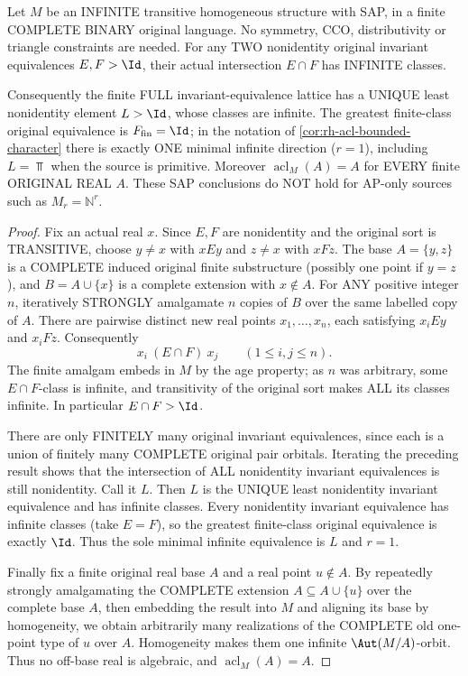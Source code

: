 \begin{lemma}
\label{lem:rh-sap-invariant-monolith}
Let $M$ be an INFINITE transitive homogeneous structure
with SAP, in a finite COMPLETE BINARY original language.
No symmetry, CCO, distributivity or triangle constraints
are needed. For any TWO nonidentity original invariant
equivalences $E,F>\Id$, their actual intersection
$E\cap F$ has INFINITE classes.

Consequently the finite FULL invariant-equivalence lattice
has a UNIQUE least nonidentity element $L>\Id$, whose
classes are infinite. The greatest finite-class original
equivalence is $F_{\mathrm{fin}}=\Id$; in the notation of
\cref{cor:rh-acl-bounded-character} there is exactly
ONE minimal infinite direction ($r=1$), including
$L=\Top$ when the source is primitive.
Moreover $\operatorname{acl}_M(A)=A$ for EVERY finite
ORIGINAL REAL $A$. These SAP conclusions do NOT
hold for AP-only sources such as $M_r=\mathbb N^r$.
\end{lemma}
\begin{proof}
Fix an actual real $x$. Since $E,F$ are nonidentity
and the original sort is TRANSITIVE,
choose $y\ne x$ with $xEy$ and
$z\ne x$ with $xFz$.
The base $A=\{y,z\}$ is a COMPLETE induced original
finite substructure (possibly one point if $y=z$),
and $B=A\cup\{x\}$ is a complete extension with
$x\notin A$.  For ANY positive integer $n$,
iteratively STRONGLY amalgamate $n$ copies of $B$
over the same labelled copy of $A$.
There are pairwise distinct new real points
$x_1,\ldots,x_n$, each satisfying
$x_iEy$ and $x_iFz$. Consequently
\[
                 x_i\ (E\cap F)\ x_j
                  \qquad(1\le i,j\le n).
\]
The finite amalgam embeds in $M$ by the age
property; as $n$ was arbitrary, some
$E\cap F$-class is infinite, and transitivity
of the original sort makes ALL its classes
infinite. In particular $E\cap F>\Id$.

There are only FINITELY many original invariant
equivalences, since each is a union of
finitely many COMPLETE original pair orbitals.
Iterating the preceding result shows that the
intersection of ALL nonidentity invariant
equivalences is still nonidentity.
Call it $L$. Then $L$ is the UNIQUE least
nonidentity invariant equivalence and has
infinite classes. Every nonidentity invariant
equivalence has infinite classes (take $E=F$),
so the greatest finite-class original equivalence
is exactly $\Id$. Thus the sole minimal infinite
equivalence is $L$ and $r=1$.

Finally fix a finite original real base $A$
and a real point $u\notin A$.
By repeatedly strongly amalgamating
the COMPLETE extension $A\subseteq A\cup\{u\}$
over the complete base $A$, then embedding
the result into $M$ and aligning its base by
homogeneity, we obtain arbitrarily many
realizations of the COMPLETE old one-point
type of $u$ over $A$. Homogeneity makes them
one infinite $\Aut(M/A)$-orbit.
Thus no off-base real is algebraic, and
$\operatorname{acl}_M(A)=A$.
\end{proof}

